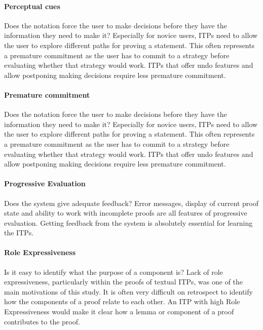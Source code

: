 \documentclass[
]{article}
\begin{document}
\hypertarget{perceptual-cues}{%
\paragraph{Perceptual cues}\label{perceptual-cues}}

Does the notation force the user to make decisions before they have the
information they need to make it? Especially for novice users, ITPs need
to allow the user to explore different paths for proving a statement.
This often represents a premature commitment as the user has to commit
to a strategy before evaluating whether that strategy would work. ITPs
that offer undo features and allow postponing making decisions require
less premature commitment.

\hypertarget{premature-commitment}{%
\paragraph{Premature commitment}\label{premature-commitment}}

Does the notation force the user to make decisions before they have the
information they need to make it? Especially for novice users, ITPs need
to allow the user to explore different paths for proving a statement.
This often represents a premature commitment as the user has to commit
to a strategy before evaluating whether that strategy would work. ITPs
that offer undo features and allow postponing making decisions require
less premature commitment.

\hypertarget{progressive-evaluation}{%
\paragraph{Progressive Evaluation}\label{progressive-evaluation}}

Does the system give adequate feedback? Error messages, display of
current proof state and ability to work with incomplete proofs are all
features of progressive evaluation. Getting feedback from the system is
absolutely essential for learning the ITPs.

\hypertarget{role-expressiveness}{%
\paragraph{Role Expressiveness}\label{role-expressiveness}}

Is it easy to identify what the purpose of a component is? Lack of role
expressiveness, particularly within the proofs of textual ITPs, was one
of the main motivations of this study. It is often very difficult on
retrospect to identify how the components of a proof relate to each
other. An ITP with high Role Expressiveness would make it clear how a
lemma or component of a proof contributes to the proof.
\end{document}
